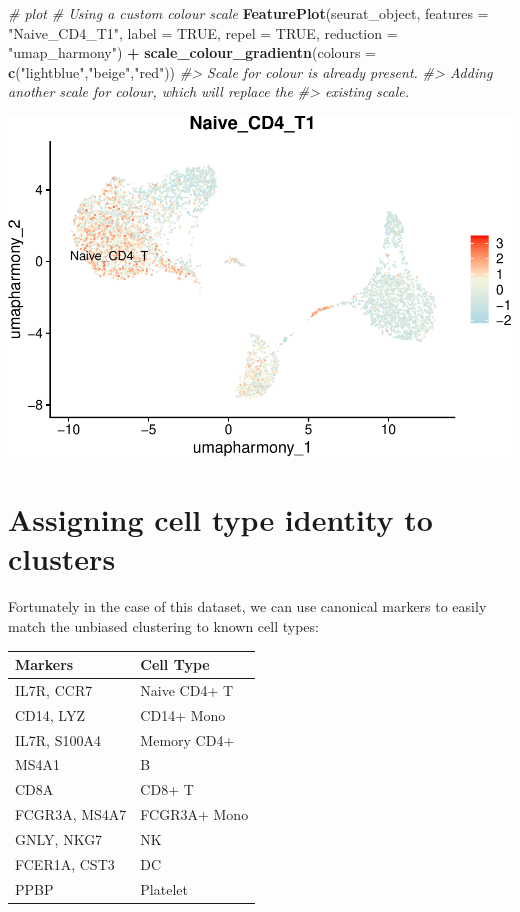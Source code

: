\documentclass[
]{book}
\newenvironment{Shaded}{\begin{snugshade}}{\end{snugshade}}
\newcommand{\AttributeTok}[1]{\textcolor[rgb]{0.13,0.29,0.53}{#1}}
\newcommand{\CommentTok}[1]{\textcolor[rgb]{0.56,0.35,0.01}{\textit{#1}}}
\newcommand{\ConstantTok}[1]{\textcolor[rgb]{0.56,0.35,0.01}{#1}}
\newcommand{\FunctionTok}[1]{\textcolor[rgb]{0.13,0.29,0.53}{\textbf{#1}}}
\newcommand{\NormalTok}[1]{#1}
\newcommand{\SpecialCharTok}[1]{\textcolor[rgb]{0.81,0.36,0.00}{\textbf{#1}}}
\newcommand{\StringTok}[1]{\textcolor[rgb]{0.31,0.60,0.02}{#1}}
\begin{document}
\begin{Shaded}
\begin{Highlighting}[]
\CommentTok{\# plot}
\CommentTok{\# Using a custom colour scale }
\FunctionTok{FeaturePlot}\NormalTok{(seurat\_object, }\AttributeTok{features =} \StringTok{"Naive\_CD4\_T1"}\NormalTok{, }\AttributeTok{label =} \ConstantTok{TRUE}\NormalTok{, }\AttributeTok{repel =} \ConstantTok{TRUE}\NormalTok{, }\AttributeTok{reduction =} \StringTok{"umap\_harmony"}\NormalTok{) }\SpecialCharTok{+} \FunctionTok{scale\_colour\_gradientn}\NormalTok{(}\AttributeTok{colours =} \FunctionTok{c}\NormalTok{(}\StringTok{"lightblue"}\NormalTok{,}\StringTok{"beige"}\NormalTok{,}\StringTok{"red"}\NormalTok{))}
\CommentTok{\#\textgreater{} Scale for colour is already present.}
\CommentTok{\#\textgreater{} Adding another scale for colour, which will replace the}
\CommentTok{\#\textgreater{} existing scale.}
\end{Highlighting}
\end{Shaded}

\includegraphics{scRNAseqInR_ABACBS_2024_Doco_files/figure-latex/unnamed-chunk-28-1.pdf}

\hypertarget{assigning-cell-type-identity-to-clusters}{%
\section{Assigning cell type identity to clusters}\label{assigning-cell-type-identity-to-clusters}}

Fortunately in the case of this dataset, we can use canonical markers to easily match the unbiased clustering to known cell types:

\begin{longtable}[]{@{}ll@{}}
\toprule\noalign{}
Markers & Cell Type \\
\midrule\noalign{}
\endhead
\bottomrule\noalign{}
\endlastfoot
IL7R, CCR7 & Naive CD4+ T \\
CD14, LYZ & CD14+ Mono \\
IL7R, S100A4 & Memory CD4+ \\
MS4A1 & B \\
CD8A & CD8+ T \\
FCGR3A, MS4A7 & FCGR3A+ Mono \\
GNLY, NKG7 & NK \\
FCER1A, CST3 & DC \\
PPBP & Platelet \\
\end{longtable}
\end{document}
